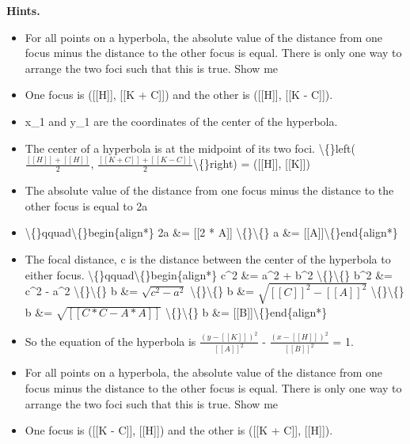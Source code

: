 \documentclass{article}
\begin{document}
\textbf{Hints.}
\begin{itemize}
  \item For all points on a hyperbola, the absolute value of the distance from one focus minus the distance to the other focus is equal.
                        There is only one way to arrange the two foci such that this is true.
                        Show me
  \item One focus is ([[H]], [[K + C]]) and the other is ([[H]], [[K - C]]).
  \item x\_1 and y\_1 are the coordinates of the center of the hyperbola.
  \item The center of a hyperbola is at the midpoint of its two foci.
                        \textbackslash\{\}left($\frac{[[H]] + [[H]]}{2}$, $\frac{[[K+C]] + [[K-C]]}{2}$\textbackslash\{\}right) = ([[H]], [[K]])
  \item The absolute value of the distance from one focus minus the distance to the other focus is equal to 2a
  \item \textbackslash\{\}qquad\textbackslash\{\}begin\{align*\}
                            2a \&= [[2 * A]] \textbackslash\{\}\textbackslash\{\}
                            a \&= [[A]]\textbackslash\{\}end\{align*\}
  \item The focal distance, c is the distance between the center of the hyperbola to either focus.
                        \textbackslash\{\}qquad\textbackslash\{\}begin\{align*\}
                            c\textasciicircum{}2 \&= a\textasciicircum{}2 + b\textasciicircum{}2 \textbackslash\{\}\textbackslash\{\}
                            b\textasciicircum{}2 \&= c\textasciicircum{}2 - a\textasciicircum{}2 \textbackslash\{\}\textbackslash\{\}
                            b \&= $\sqrt{c^2 - a^2}$ \textbackslash\{\}\textbackslash\{\}
                            b \&= $\sqrt{[[C]]^2 - [[A]]^2}$ \textbackslash\{\}\textbackslash\{\}
                            b \&= $\sqrt{[[C * C - A * A]]}$ \textbackslash\{\}\textbackslash\{\}
                            b \&= [[B]]\textbackslash\{\}end\{align*\}
  \item So the equation of the hyperbola is
                        $\frac{(y - [[K]])^2}{[[A]]^2}$ - $\frac{(x - [[H]])^2}{[[B]]^2}$ = 1.
  \item For all points on a hyperbola, the absolute value of the distance from one focus minus the distance to the other focus is equal.
                        There is only one way to arrange the two foci such that this is true.
                        Show me
  \item One focus is ([[K - C]], [[H]]) and the other is ([[K + C]], [[H]]).

\end{itemize}
\end{document}
